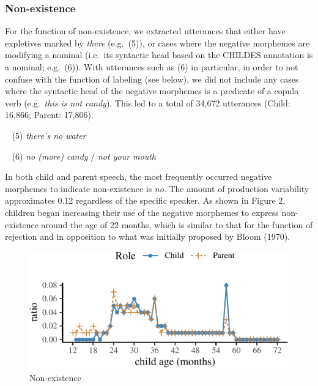 \documentclass[10pt, letterpaper]{article}
\newenvironment{CodeChunk}{}{}
\begin{document}
\hypertarget{non-existence}{%
\subsubsection{Non-existence}\label{non-existence}}

For the function of non-existence, we extracted utterances that either
have expletives marked by \emph{there} (e.g.~(5)), or cases where the
negative morphemes are modifying a nominal (i.e.~its syntactic head
based on the CHILDES annotation is a nominal; e.g.~(6)). With utterances
such as (6) in particular, in order to not confuse with the function of
labeling (see below), we did not include any cases where the syntactic
head of the negative morphemes is a predicate of a copula verb
(e.g.~\emph{this is not candy}). This led to a total of 34,672
utterances (Child: 16,866; Parent: 17,806).

~ (5) \emph{there's no water}

~ (6) \emph{no (more) candy} / \emph{not your mouth}

In both child and parent speech, the most frequently occurred negative
morphemes to indicate non-existence is \emph{no}. The amount of
production variability approximates 0.12 regardless of the specific
speaker. As shown in Figure 2, children began increasing their use of
the negative morphemes to express non-existence around the age of 22
months, which is similar to that for the function of rejection and in
opposition to what was initially proposed by Bloom (1970).

\begin{CodeChunk}
\begin{figure}[H]

{\centering \includegraphics{figs/existence-1} 

}

\caption[Non-existence]{Non-existence}\label{fig:existence}
\end{figure}
\end{CodeChunk}
\end{document}
